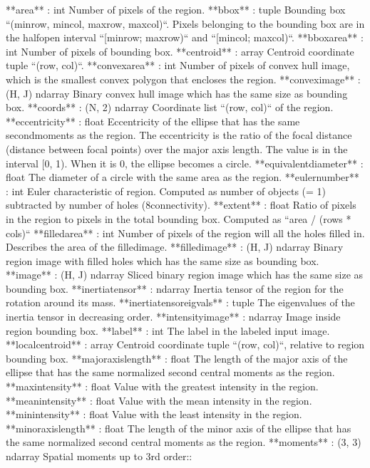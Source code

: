 \documentclass[letterpaper,10pt,english]{sphinxmanual}
\begin{document}
\begin{sphinxVerbatim}[commandchars=\\\{\}]
    **area** : int
        Number of pixels of the region.
    **bbox** : tuple
        Bounding box ``(min\PYGZus{}row, min\PYGZus{}col, max\PYGZus{}row, max\PYGZus{}col)``.
        Pixels belonging to the bounding box are in the half\PYGZhy{}open interval
        ``[min\PYGZus{}row; max\PYGZus{}row)`` and ``[min\PYGZus{}col; max\PYGZus{}col)``.
    **bbox\PYGZus{}area** : int
        Number of pixels of bounding box.
    **centroid** : array
        Centroid coordinate tuple ``(row, col)``.
    **convex\PYGZus{}area** : int
        Number of pixels of convex hull image, which is the smallest convex
        polygon that encloses the region.
    **convex\PYGZus{}image** : (H, J) ndarray
        Binary convex hull image which has the same size as bounding box.
    **coords** : (N, 2) ndarray
        Coordinate list ``(row, col)`` of the region.
    **eccentricity** : float
        Eccentricity of the ellipse that has the same second\PYGZhy{}moments as the
        region. The eccentricity is the ratio of the focal distance
        (distance between focal points) over the major axis length.
        The value is in the interval [0, 1).
        When it is 0, the ellipse becomes a circle.
    **equivalent\PYGZus{}diameter** : float
        The diameter of a circle with the same area as the region.
    **euler\PYGZus{}number** : int
        Euler characteristic of region. Computed as number of objects (= 1)
        subtracted by number of holes (8\PYGZhy{}connectivity).
    **extent** : float
        Ratio of pixels in the region to pixels in the total bounding box.
        Computed as ``area / (rows * cols)``
    **filled\PYGZus{}area** : int
        Number of pixels of the region will all the holes filled in. Describes
        the area of the filled\PYGZus{}image.
    **filled\PYGZus{}image** : (H, J) ndarray
        Binary region image with filled holes which has the same size as
        bounding box.
    **image** : (H, J) ndarray
        Sliced binary region image which has the same size as bounding box.
    **inertia\PYGZus{}tensor** : ndarray
        Inertia tensor of the region for the rotation around its mass.
    **inertia\PYGZus{}tensor\PYGZus{}eigvals** : tuple
        The eigenvalues of the inertia tensor in decreasing order.
    **intensity\PYGZus{}image** : ndarray
        Image inside region bounding box.
    **label** : int
        The label in the labeled input image.
    **local\PYGZus{}centroid** : array
        Centroid coordinate tuple ``(row, col)``, relative to region bounding
        box.
    **major\PYGZus{}axis\PYGZus{}length** : float
        The length of the major axis of the ellipse that has the same
        normalized second central moments as the region.
    **max\PYGZus{}intensity** : float
        Value with the greatest intensity in the region.
    **mean\PYGZus{}intensity** : float
        Value with the mean intensity in the region.
    **min\PYGZus{}intensity** : float
        Value with the least intensity in the region.
    **minor\PYGZus{}axis\PYGZus{}length** : float
        The length of the minor axis of the ellipse that has the same
        normalized second central moments as the region.
    **moments** : (3, 3) ndarray
        Spatial moments up to 3rd order::
    

\end{sphinxVerbatim}
\end{document}
